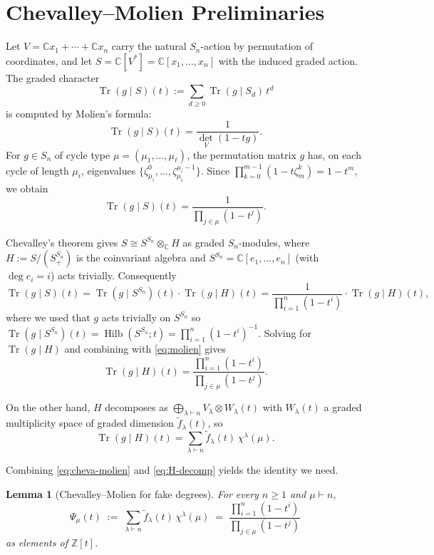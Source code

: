 \documentclass[11pt]{article}
\newtheorem{lemma}[theorem]{Lemma}
\theoremstyle{remark}
\DeclareMathOperator{\Tr}{Tr}
\DeclareMathOperator{\Hilb}{Hilb}
\newcommand{\ftilde}{\widetilde{f}}
\newcommand{\ZZ}{\mathbb{Z}}
\newcommand{\CC}{\mathbb{C}}
\begin{document}
\section{Chevalley--Molien Preliminaries}

Let $V = \CC x_1 + \cdots + \CC x_n$ carry the natural $S_n$-action by permutation of coordinates, and let $S = \CC[V^*] = \CC[x_1, \ldots, x_n]$ with the induced graded action. The graded character
\[
  \Tr(g \mid S)(t) := \sum_{d \ge 0} \Tr(g \mid S_d)\, t^d
\]
is computed by Molien's formula:
\[
  \Tr(g \mid S)(t) = \frac{1}{\det_V(1 - t g)}.
\]
For $g \in S_n$ of cycle type $\mu = (\mu_1, \ldots, \mu_\ell)$, the permutation matrix $g$ has, on each cycle of length $\mu_i$, eigenvalues $\{\zeta_{\mu_i}^{0}, \ldots, \zeta_{\mu_i}^{\mu_i - 1}\}$. Since $\prod_{k=0}^{m-1}(1 - t\zeta_m^k) = 1 - t^m$, we obtain
\begin{equation}\label{eq:molien}
  \Tr(g \mid S)(t) = \frac{1}{\prod_{j \in \mu}(1 - t^j)}.
\end{equation}

Chevalley's theorem gives $S \cong S^{S_n} \otimes_\CC H$ as graded $S_n$-modules, where $H := S / (S^{S_n}_{+})$ is the coinvariant algebra and $S^{S_n} = \CC[e_1, \ldots, e_n]$ (with $\deg e_i = i$) acts trivially. Consequently
\[
  \Tr(g \mid S)(t) = \Tr(g \mid S^{S_n})(t) \cdot \Tr(g \mid H)(t) = \frac{1}{\prod_{i=1}^n (1 - t^i)} \cdot \Tr(g \mid H)(t),
\]
where we used that $g$ acts trivially on $S^{S_n}$ so $\Tr(g \mid S^{S_n})(t) = \Hilb(S^{S_n}; t) = \prod_{i=1}^n (1-t^i)^{-1}$. Solving for $\Tr(g \mid H)$ and combining with \eqref{eq:molien} gives
\begin{equation}\label{eq:cheva-molien}
  \Tr(g \mid H)(t) = \frac{\prod_{i=1}^n (1 - t^i)}{\prod_{j \in \mu}(1 - t^j)}.
\end{equation}

On the other hand, $H$ decomposes as $\bigoplus_{\lambda \vdash n} V_\lambda \otimes W_\lambda(t)$ with $W_\lambda(t)$ a graded multiplicity space of graded dimension $\ftilde_\lambda(t)$, so
\begin{equation}\label{eq:H-decomp}
  \Tr(g \mid H)(t) = \sum_{\lambda \vdash n} \ftilde_\lambda(t)\, \chi^\lambda(\mu).
\end{equation}

Combining \eqref{eq:cheva-molien} and \eqref{eq:H-decomp} yields the identity we need.

\begin{lemma}[Chevalley--Molien for fake degrees]\label{lem:cm}
For every $n \ge 1$ and $\mu \vdash n$,
\[
  \Psi_\mu(t) \;:=\; \sum_{\lambda \vdash n} \ftilde_\lambda(t)\, \chi^\lambda(\mu) \;=\; \frac{\prod_{i=1}^n (1 - t^i)}{\prod_{j \in \mu}(1 - t^j)}
\]
as elements of $\ZZ[t]$.
\end{lemma}
\end{document}
